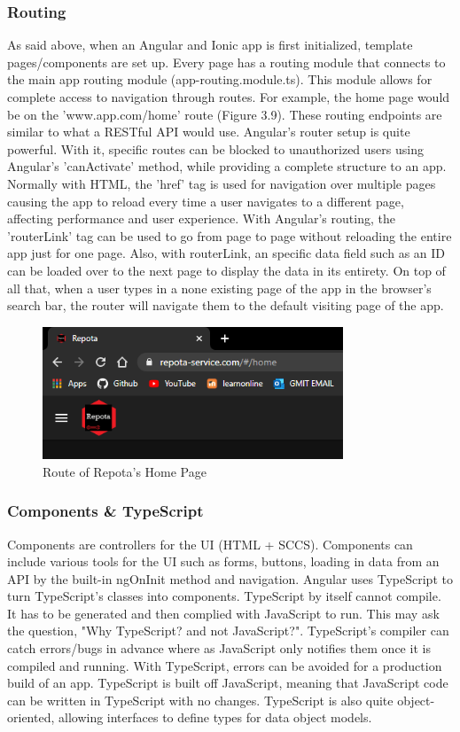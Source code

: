 \subsubsection{Routing}
As said above, when an Angular and Ionic app is first initialized, template pages/components are set up. Every page has a routing module that connects to the main app routing module (app-routing.module.ts). This module allows for complete access to navigation through routes. For example, the home page would be on the 'www.app.com/home' route (Figure 3.9). These routing endpoints are similar to what a RESTful API would use. Angular's router setup is quite powerful. With it, specific routes can be blocked to unauthorized users using Angular's 'canActivate' method, while providing a complete structure to an app. Normally with HTML, the 'href' tag is used for navigation over multiple pages causing the app to reload every time a user navigates to a different page, affecting performance and user experience. With Angular's routing, the 'routerLink' tag can be used to go from page to page without reloading the entire app just for one page. Also, with routerLink, an specific data field such as an ID can be loaded over to the next page to display the data in its entirety. On top of all that, when a user types in a none existing page of the app in the browser's search bar, the router will navigate them to the default visiting page of the app. \cite{ref15}

\begin{figure}[H]
    \caption{Route of Repota's Home Page}
    \label{image:homeRoute}
    \centering
    \includegraphics[width=0.8\textwidth]{images/misc/home-route.png}
\end{figure}

\subsubsection{Components \& TypeScript}
Components are controllers for the UI (HTML + SCCS). Components can include various tools for the UI such as forms, buttons, loading in data from an API by the built-in ngOnInit method and navigation. Angular uses TypeScript to turn TypeScript's classes into components. TypeScript by itself cannot compile. It has to be generated and then complied with JavaScript to run. This may ask the question, "Why TypeScript? and not JavaScript?". TypeScript's compiler can catch errors/bugs in advance where as JavaScript only notifies them once it is compiled and running. With TypeScript, errors can be avoided for a production build of an app. TypeScript is built off JavaScript, meaning that JavaScript code can be written in TypeScript with no changes. TypeScript is also quite object-oriented, allowing interfaces to define types for data object models. \cite{ref16}

